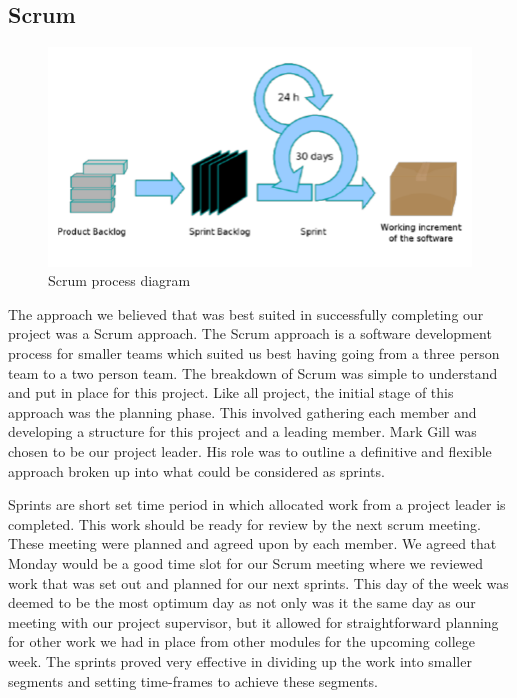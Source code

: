 \subsection{Scrum}
\begin{figure}
\includegraphics[scale=0.25]{img/Diagram-of-Scrum-agile-method-13.png}
\caption{Scrum process diagram \cite{inproceedings}}
\end{figure}
The approach we believed that was best suited in successfully completing our project was a Scrum approach. The Scrum approach is a software development process for smaller teams which suited us best having going from a three person team to a two person team. The breakdown of Scrum was simple to understand and put in place for this project. Like all project, the initial stage of this approach was the planning phase. This involved gathering each member and developing a structure for this project and a leading member. Mark Gill was chosen to be our project leader. His role was to outline a definitive and flexible approach broken up into what could be considered as sprints\cite{rising2000scrum}.

Sprints are short set time period in which allocated work from a project leader is completed. This work should be ready for review by the next scrum meeting. These meeting were planned and agreed upon by each member. We agreed that Monday would be a good time slot for our Scrum meeting where we reviewed work that was set out and planned for our next sprints. This day of the week was deemed to be the most optimum day as not only was it the same day as our meeting with our project supervisor, but it allowed for straightforward planning for other work we had in place from other modules for the upcoming college week. The sprints proved very effective in dividing up the work into smaller segments and setting time-frames to achieve these segments\cite{rising2000scrum}.

